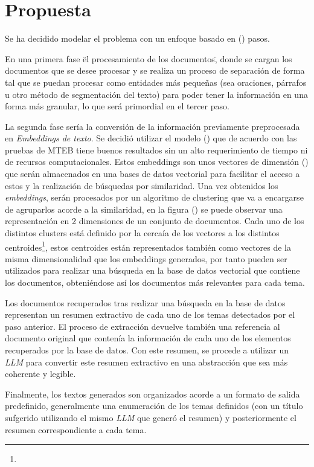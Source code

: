 \chapter{Propuesta}\label{chapter:proposal}
    Se ha decidido modelar el problema con un enfoque basado en () pasos.

    En una primera fase  \" el procesamiento de los documentos\", donde se cargan los documentos que se desee procesar y se realiza un proceso de separación de forma tal que se puedan procesar como entidades más pequeñas (sea oraciones, párrafos u otro método de segmentación del texto) para poder tener la información en una forma más granular, lo que será primordial en el tercer paso.
    
    La segunda fase sería la conversión de la información previamente preprocesada en \emph{Embeddings de texto}. Se decidió utilizar el modelo () que de acuerdo con las pruebas de MTEB\cite{leaderboard} tiene buenos resultados sin un alto requerimiento de tiempo ni de recursos computacionales. Estos embeddings son unos vectores de dimensión () que serán almacenados en una bases de datos vectorial para facilitar el acceso a estos y la realización de búsquedas por similaridad.
    Una vez obtenidos los \emph{embeddings}, serán procesados por un algoritmo de clustering que va a encargarse de agruparlos acorde a la similaridad, en la figura () se puede observar una representación en 2 dimensiones de un conjunto de documentos. Cada uno de los distintos clusters está definido por la cercaía de los vectores a los distintos centroides\footnote{}, estos centroides están representados también como vectores de la misma dimensionalidad que los embeddings generados, por tanto pueden ser utilizados para realizar una búsqueda en la base de datos vectorial que contiene los documentos, obteniéndose así los documentos más relevantes para cada tema.

    Los documentos recuperados tras realizar una búsqueda en la base de datos representan un resumen extractivo de cada uno de los temas detectados por el paso anterior. El proceso de extracción devuelve también una referencia al documento original que contenía la información de cada uno de los elementos recuperados por la base de datos. Con este resumen, se procede a utilizar un \emph{LLM} para convertir este resumen extractivo en una abstracción que sea más coherente y legible.

    Finalmente, los textos generados son organizados acorde a un formato de salida predefinido, generalmente una enumeración de los temas definidos (con un título sufgerido utilizando el mismo \emph{LLM} que generó el resumen) y posteriormente el resumen correspondiente a cada tema.
